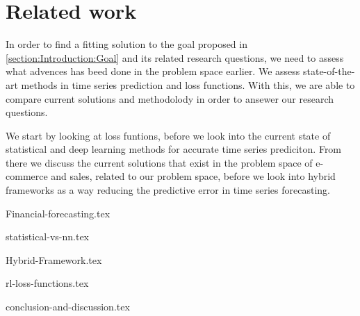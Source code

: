 \chapter{Related work}
\label{section:RelatedWork}

\iffalse
Our problem can be composed into two main categories.
time series forecasting, and e-commerce trend forecasting.
What is the characteristics of e-commerce trend forecasting?
The domain consists of multiple time series, some which correlate.
The time series contains multiple periods, for example users shop
online ofter on sundays than on mondays. 
Some categories are popular in the spring, others in the fall.
Mabye online shopping spikes around common paydays?
\fi


In order to find a fitting solution to the goal proposed in \ref{section:Introduction:Goal} and its related research questions,
we need to assess what advences has beed done in the problem space earlier.
We assess state-of-the-art methods in time series prediction and loss functions.
With this, we are able to compare current solutions and methodolody in order to ansewer our research questions.

We start by looking at loss funtions, before we look into the current state of statistical and deep learning methods for accurate time series prediciton.
From there we discuss the current solutions that exist in the problem space of e-commerce and sales, related to our problem space,
before we look into hybrid frameworks as a way reducing the predictive error in time series forecasting.



{Financial-forecasting.tex}

{statistical-vs-nn.tex}

{Hybrid-Framework.tex}

{rl-loss-functions.tex}

{conclusion-and-discussion.tex}